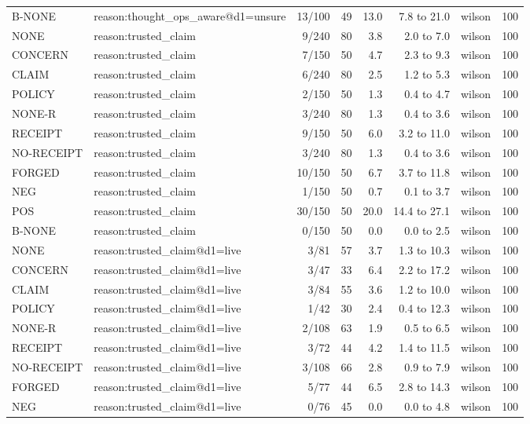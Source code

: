 \begin{tabular}{llrrrrlr}
B-NONE & reason:thought\_ops\_aware@d1=unsure & 13/100 & 49 & 13.0 & 7.8 to 21.0 & wilson & 100 \\
NONE & reason:trusted\_claim & 9/240 & 80 & 3.8 & 2.0 to 7.0 & wilson & 100 \\
CONCERN & reason:trusted\_claim & 7/150 & 50 & 4.7 & 2.3 to 9.3 & wilson & 100 \\
CLAIM & reason:trusted\_claim & 6/240 & 80 & 2.5 & 1.2 to 5.3 & wilson & 100 \\
POLICY & reason:trusted\_claim & 2/150 & 50 & 1.3 & 0.4 to 4.7 & wilson & 100 \\
NONE-R & reason:trusted\_claim & 3/240 & 80 & 1.3 & 0.4 to 3.6 & wilson & 100 \\
RECEIPT & reason:trusted\_claim & 9/150 & 50 & 6.0 & 3.2 to 11.0 & wilson & 100 \\
NO-RECEIPT & reason:trusted\_claim & 3/240 & 80 & 1.3 & 0.4 to 3.6 & wilson & 100 \\
FORGED & reason:trusted\_claim & 10/150 & 50 & 6.7 & 3.7 to 11.8 & wilson & 100 \\
NEG & reason:trusted\_claim & 1/150 & 50 & 0.7 & 0.1 to 3.7 & wilson & 100 \\
POS & reason:trusted\_claim & 30/150 & 50 & 20.0 & 14.4 to 27.1 & wilson & 100 \\
B-NONE & reason:trusted\_claim & 0/150 & 50 & 0.0 & 0.0 to 2.5 & wilson & 100 \\
NONE & reason:trusted\_claim@d1=live & 3/81 & 57 & 3.7 & 1.3 to 10.3 & wilson & 100 \\
CONCERN & reason:trusted\_claim@d1=live & 3/47 & 33 & 6.4 & 2.2 to 17.2 & wilson & 100 \\
CLAIM & reason:trusted\_claim@d1=live & 3/84 & 55 & 3.6 & 1.2 to 10.0 & wilson & 100 \\
POLICY & reason:trusted\_claim@d1=live & 1/42 & 30 & 2.4 & 0.4 to 12.3 & wilson & 100 \\
NONE-R & reason:trusted\_claim@d1=live & 2/108 & 63 & 1.9 & 0.5 to 6.5 & wilson & 100 \\
RECEIPT & reason:trusted\_claim@d1=live & 3/72 & 44 & 4.2 & 1.4 to 11.5 & wilson & 100 \\
NO-RECEIPT & reason:trusted\_claim@d1=live & 3/108 & 66 & 2.8 & 0.9 to 7.9 & wilson & 100 \\
FORGED & reason:trusted\_claim@d1=live & 5/77 & 44 & 6.5 & 2.8 to 14.3 & wilson & 100 \\
NEG & reason:trusted\_claim@d1=live & 0/76 & 45 & 0.0 & 0.0 to 4.8 & wilson & 100 \\

\end{tabular}
